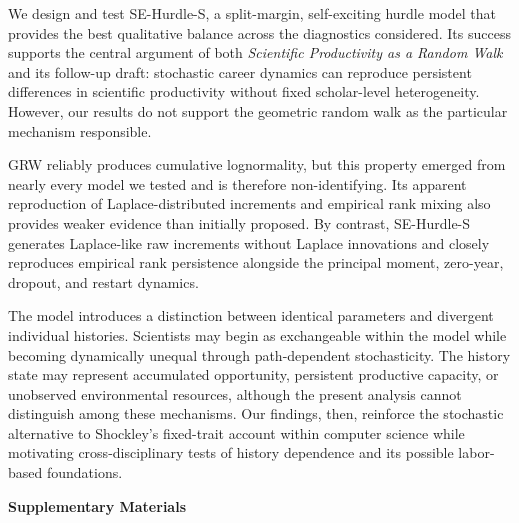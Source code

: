 \documentclass[twocolumn, letterpaper]{article}
\begin{document}
We design and test SE-Hurdle-S, a split-margin, self-exciting hurdle model that provides the best qualitative balance across the diagnostics considered. Its success supports the central argument of both \textit{Scientific Productivity as a Random Walk} and its follow-up draft: stochastic career dynamics can reproduce persistent differences in scientific productivity without fixed scholar-level heterogeneity. However, our results do not support the geometric random walk as the particular mechanism responsible.

GRW reliably produces cumulative lognormality, but this property emerged from nearly every model we tested and is therefore non-identifying. Its apparent reproduction of Laplace-distributed increments and empirical rank mixing also provides weaker evidence than initially proposed. By contrast, SE-Hurdle-S generates Laplace-like raw increments without Laplace innovations and closely reproduces empirical rank persistence alongside the principal moment, zero-year, dropout, and restart dynamics.

The model introduces a distinction between identical parameters and divergent individual histories. Scientists may begin as exchangeable within the model while becoming dynamically unequal through path-dependent stochasticity. The history state may represent accumulated opportunity, persistent productive capacity, or unobserved environmental resources, although the present analysis cannot distinguish among these mechanisms. Our findings, then, reinforce the stochastic alternative to Shockley's fixed-trait account within computer science while motivating cross-disciplinary tests of history dependence and its possible labor-based foundations.




\clearpage

\onecolumn
\begin{center}
    {\Large\bfseries Supplementary Materials}
\end{center}
\vspace{1em}


\setcounter{section}{0}
\renewcommand{\thesection}{Supp. \arabic{section}}
\end{document}
